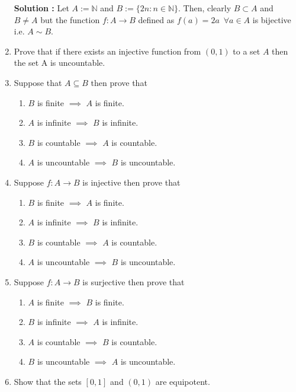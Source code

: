 \documentclass[10pt]{article}
\newcommand{\nn}{\mathbb{N}}
\begin{document}
\begin{enumerate}
    \textbf{Solution : }Let $A := \nn$ and $B := \{2n : n \in \nn \}$. Then, clearly $B \subset A$ and $B \neq A$ but the function $f : A \to B$ defined as $f(a) = 2a \,\,\, \forall a \in A$ is bijective i.e. $A \sim B$.
    \item Prove that if there exists an injective function from $(0, 1)$ to a set $A$ then the set A is uncountable.
    \item Suppose that $A \subseteq B$ then prove that 
    \begin{enumerate}
        \item $B$ is finite $\implies$ $A$ is finite.
        \item $A$ is infinite $\implies$ $B$ is infinite.
        \item $B$ is countable $\implies$ $A$ is countable.
        \item $A$ is uncountable $\implies$ $B$ is uncountable.
    \end{enumerate}
    \item Suppose $f : A \to B$ is injective then prove that 
    \begin{enumerate}
        \item $B$ is finite $\implies$ $A$ is finite.
        \item $A$ is infinite $\implies$ $B$ is infinite.
        \item $B$ is countable $\implies$ $A$ is countable.
        \item $A$ is uncountable $\implies$ $B$ is uncountable.
    \end{enumerate}
    \item Suppose $f : A \to B$ is surjective then prove that 
    \begin{enumerate}
        \item $A$ is finite $\implies$ $B$ is finite.
        \item $B$ is infinite $\implies$ $A$ is infinite.
        \item $A$ is countable $\implies$ $B$ is countable.
        \item $B$ is uncountable $\implies$ $A$ is uncountable.
    \end{enumerate}
    \item Show that the sets $[0, 1]$ and $(0, 1)$ are equipotent.
    

\end{enumerate}
\end{document}
